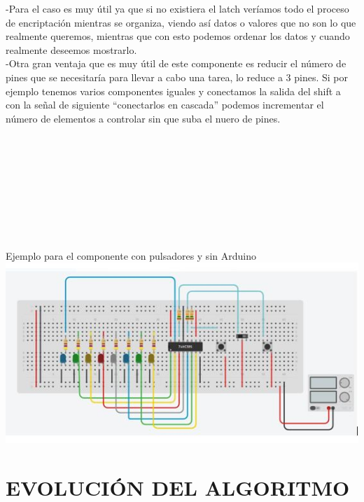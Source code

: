 \documentclass{article}
\begin{document}
-Para el caso es muy útil ya que si no existiera el latch veríamos todo el proceso de encriptación mientras se organiza, viendo así datos o valores que no son lo que realmente queremos, mientras que con esto podemos ordenar los datos y cuando realmente deseemos mostrarlo.\\

-Otra gran ventaja que es muy útil de este componente es reducir el número de pines que se necesitaría para llevar a cabo una tarea, lo reduce a 3 pines. Si por ejemplo tenemos varios componentes iguales y conectamos la salida del shift a con la señal de siguiente “conectarlos en cascada” podemos incrementar el número de elementos a controlar sin que suba el nuero de pines.\\
\\
\\
\\
\\
\\
\\
\\
\\
\\
Ejemplo para el componente con pulsadores y sin Arduino\\

\includegraphics{Captura1.JPG}





\newpage
\section{EVOLUCIÓN DEL ALGORITMO}
\label{evolucion}
\end{document}
